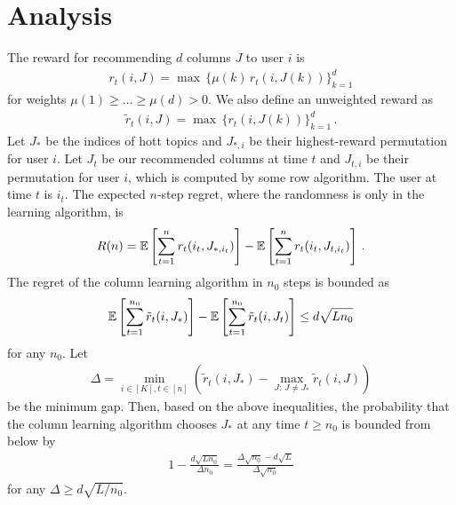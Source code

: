 
\clearpage
\onecolumn
\appendix

\section{Analysis}
\label{sec:analysis}

The reward for recommending $d$ columns $J$ to user $i$ is
\begin{align*}
  r_t(i, J) =
  \max \, \{\mu(k) \, r_t(i, J(k))\}_{k = 1}^d
\end{align*}
for weights $\mu(1) \geq \dots \geq \mu(d) > 0$. We also define an unweighted reward as
\begin{align*}
  \tilde{r}_t(i, J) =
  \max \, \{r_t(i, J(k))\}_{k = 1}^d\,.
\end{align*}
Let $J_\ast$ be the indices of hott topics and $J_{\ast, i}$ be their highest-reward permutation for user $i$. Let $J_t$ be our recommended columns at time $t$ and $J_{t, i}$ be their permutation for user $i$, which is computed by some row algorithm. The user at time $t$ is $i_t$. The expected $n$-step regret, where the randomness is only in the learning algorithm, is
\begin{align*}
  R(n) =
  \mathbb{E}\left[\sum_{t = 1}^n r_t(i_t, J_{\ast, i_t})\right] - \mathbb{E}\left[\sum_{t = 1}^n r_t(i_t, J_{t, i_t})\right]\,.
\end{align*}
The regret of the column learning algorithm in $n_0$ steps is bounded as
\begin{align*}
  \mathbb{E}\left[\sum_{t = 1}^{n_0} \tilde{r}_t(i, J_\ast)\right] - \mathbb{E}\left[\sum_{t = 1}^{n_0} \tilde{r}_t(i, J_t)\right] \leq
  d \sqrt{L n_0}
\end{align*}
for any $n_0$. Let
\begin{align*}
  \Delta = \min_{i \in [K], t \in [n]} \left(\tilde{r}_t(i, J_\ast) - \max_{J:\, J \neq J_\ast} \tilde{r}_t(i, J)\right)
\end{align*}
be the minimum gap. Then, based on the above inequalities, the probability that the column learning algorithm chooses $J_\ast$ at any time $t \geq n_0$ is bounded from below by
\begin{align}
  1 - \frac{d \sqrt{L n_0}}{\Delta n_0} =
  \frac{\Delta \sqrt{n_0} - d \sqrt{L}}{\Delta \sqrt{n_0}}
  \label{eq:opt lower bound}
\end{align}
for any $\Delta \geq d \sqrt{L / n_0}$.

